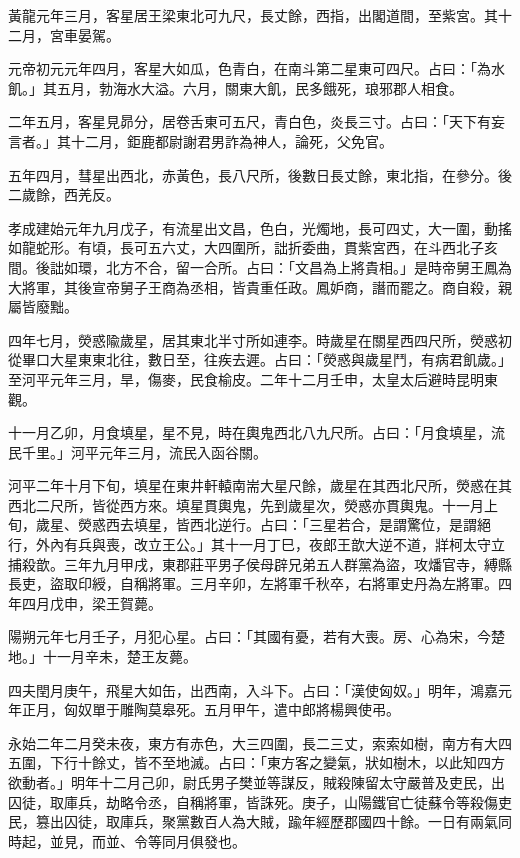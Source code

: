 \begin{pinyinscope}
黃龍元年三月，客星居王梁東北可九尺，長丈餘，西指，出閣道間，至紫宮。其十二月，宮車晏駕。

元帝初元元年四月，客星大如瓜，色青白，在南斗第二星東可四尺。占曰：「為水飢。」其五月，勃海水大溢。六月，關東大飢，民多餓死，琅邪郡人相食。

二年五月，客星見昴分，居卷舌東可五尺，青白色，炎長三寸。占曰：「天下有妄言者。」其十二月，鉅鹿都尉謝君男詐為神人，論死，父免官。

五年四月，彗星出西北，赤黃色，長八尺所，後數日長丈餘，東北指，在參分。後二歲餘，西羌反。

孝成建始元年九月戊子，有流星出文昌，色白，光燭地，長可四丈，大一圍，動搖如龍蛇形。有頃，長可五六丈，大四圍所，詘折委曲，貫紫宮西，在斗西北子亥間。後詘如環，北方不合，留一合所。占曰：「文昌為上將貴相。」是時帝舅王鳳為大將軍，其後宣帝舅子王商為丞相，皆貴重任政。鳳妒商，譖而罷之。商自殺，親屬皆廢黜。

四年七月，熒惑隃歲星，居其東北半寸所如連李。時歲星在關星西四尺所，熒惑初從畢口大星東東北往，數日至，往疾去遲。占曰：「熒惑與歲星鬥，有病君飢歲。」至河平元年三月，旱，傷麥，民食榆皮。二年十二月壬申，太皇太后避時昆明東觀。

十一月乙卯，月食填星，星不見，時在輿鬼西北八九尺所。占曰：「月食填星，流民千里。」河平元年三月，流民入函谷關。

河平二年十月下旬，填星在東井軒轅南耑大星尺餘，歲星在其西北尺所，熒惑在其西北二尺所，皆從西方來。填星貫輿鬼，先到歲星次，熒惑亦貫輿鬼。十一月上旬，歲星、熒惑西去填星，皆西北逆行。占曰：「三星若合，是謂驚位，是謂絕行，外內有兵與喪，改立王公。」其十一月丁巳，夜郎王歆大逆不道，牂柯太守立捕殺歆。三年九月甲戌，東郡莊平男子侯母辟兄弟五人群黨為盜，攻燔官寺，縛縣長吏，盜取印綬，自稱將軍。三月辛卯，左將軍千秋卒，右將軍史丹為左將軍。四年四月戊申，梁王賀薨。

陽朔元年七月壬子，月犯心星。占曰：「其國有憂，若有大喪。房、心為宋，今楚地。」十一月辛未，楚王友薨。

四夫閏月庚午，飛星大如缶，出西南，入斗下。占曰：「漢使匈奴。」明年，鴻嘉元年正月，匈奴單于雕陶莫皋死。五月甲午，遣中郎將楊興使弔。

永始二年二月癸未夜，東方有赤色，大三四圍，長二三丈，索索如樹，南方有大四五圍，下行十餘丈，皆不至地滅。占曰：「東方客之變氣，狀如樹木，以此知四方欲動者。」明年十二月己卯，尉氏男子樊並等謀反，賊殺陳留太守嚴普及吏民，出囚徒，取庫兵，劫略令丞，自稱將軍，皆誅死。庚子，山陽鐵官亡徒蘇令等殺傷吏民，篡出囚徒，取庫兵，聚黨數百人為大賊，踰年經歷郡國四十餘。一日有兩氣同時起，並見，而並、令等同月俱發也。


\end{pinyinscope}

